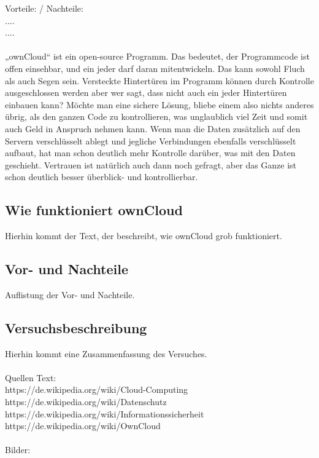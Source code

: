 Vorteile: / Nachteile:
\\....
\\....
\\
\\
„ownCloud“ ist ein open-source Programm. Das bedeutet, der Programmcode ist offen einsehbar, und ein jeder darf daran mitentwickeln. Das kann sowohl Fluch als auch Segen sein. Versteckte Hintertüren im Programm können durch Kontrolle ausgeschlossen werden aber wer sagt, dass nicht auch ein jeder Hintertüren einbauen kann? Möchte man eine sichere Lösung, bliebe einem also nichts anderes übrig, als den ganzen Code zu kontrollieren, was unglaublich viel Zeit und somit auch Geld in Anspruch nehmen kann. Wenn man die Daten zusätzlich auf den Servern verschlüsselt ablegt und jegliche Verbindungen ebenfalls verschlüsselt aufbaut, hat man schon deutlich mehr Kontrolle darüber, was mit den Daten geschieht. Vertrauen ist natürlich auch dann noch gefragt, aber das Ganze ist schon deutlich besser überblick- und kontrollierbar.
\subsection{Wie funktioniert ownCloud}
Hierhin kommt der Text, der beschreibt, wie ownCloud grob funktioniert.
\subsection{Vor- und Nachteile}
Auflistung der Vor- und Nachteile.
\subsection{Versuchsbeschreibung}
Hierhin kommt eine Zusammenfassung des Versuches.
\\
\\
Quellen Text:
\\https://de.wikipedia.org/wiki/Cloud-Computing
\\https://de.wikipedia.org/wiki/Datenschutz
\\https://de.wikipedia.org/wiki/Informationssicherheit
\\https://de.wikipedia.org/wiki/OwnCloud
\\
\\
Bilder:
